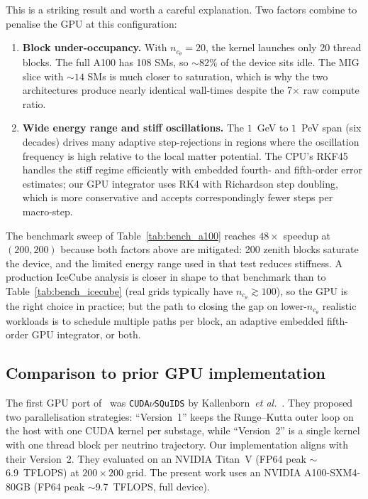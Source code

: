 This is a striking result and worth a careful explanation. Two
factors combine to penalise the GPU at this configuration:
\begin{enumerate}
  \item \textbf{Block under-occupancy.} With $n_{c_\theta}\!=\!20$,
    the kernel launches only 20 thread blocks. The full A100 has 108
    SMs, so $\sim\!82\%$ of the device sits idle. The MIG slice with
    $\sim\!14$ SMs is much closer to saturation, which is why the two
    architectures produce nearly identical wall-times despite the
    7$\times$ raw compute ratio.
  \item \textbf{Wide energy range and stiff oscillations.} The
    $1$~GeV to $1$~PeV span (six decades) drives many adaptive
    step-rejections in regions where the oscillation frequency is
    high relative to the local matter potential. The CPU's RKF45
    handles the stiff regime efficiently with embedded fourth- and
    fifth-order error estimates; our GPU integrator uses RK4 with
    Richardson step doubling, which is more conservative and accepts
    correspondingly fewer steps per macro-step.
\end{enumerate}
The benchmark sweep of Table~\ref{tab:bench_a100} reaches
$48\times$ speedup at $(200, 200)$ because both factors above are
mitigated: 200 zenith blocks saturate the device, and the limited
energy range used in that test reduces stiffness. A production
IceCube analysis is closer in shape to that benchmark than to
Table~\ref{tab:bench_icecube} (real grids typically have
$n_{c_\theta} \gtrsim 100$), so the GPU is the right choice in
practice; but the path to closing the gap on lower-$n_{c_\theta}$
realistic workloads is to schedule multiple paths per block, an
adaptive embedded fifth-order GPU integrator, or both.

\subsection{Comparison to prior GPU implementation}
\label{sec:perf_priorwork}

The first GPU port of \nusquids\ was \texttt{CUDA}$\nu$\texttt{SQuIDS}
by Kallenborn~\textit{et al.}~\cite{kallenborn2019}. They proposed
two parallelisation strategies: ``Version~1'' keeps the
Runge--Kutta outer loop on the host with one CUDA kernel per
substage, while ``Version~2'' is a single kernel with one thread
block per neutrino trajectory. Our implementation aligns with their
Version~2. They evaluated on an NVIDIA Titan~V (FP64 peak
$\sim$6.9~TFLOPS) at $200\times200$ grid. The present work uses an
NVIDIA A100-SXM4-80GB (FP64 peak $\sim$9.7~TFLOPS, full device).

